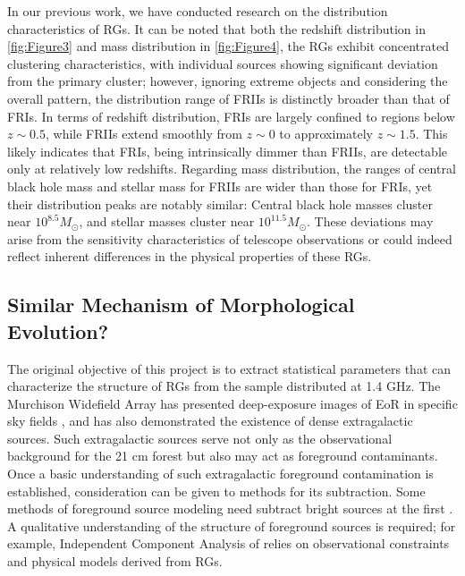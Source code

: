 \documentclass{aa}
\begin{document}
In our previous work, we have conducted research on the distribution characteristics of RGs. It can be noted that both the redshift distribution in \autoref{fig:Figure3} and mass distribution in \autoref{fig:Figure4}, the RGs exhibit concentrated clustering characteristics, with individual sources showing significant deviation from the primary cluster; however, ignoring extreme objects and considering the overall pattern, the distribution range of FRIIs is distinctly broader than that of FRIs. In terms of redshift distribution, FRIs are largely confined to regions below $z \sim 0.5$, while FRIIs extend smoothly from $z \sim 0$ to approximately $z \sim 1.5$. This likely indicates that FRIs, being intrinsically dimmer than FRIIs, are detectable only at relatively low redshifts. Regarding mass distribution, the ranges of central black hole mass and stellar mass for FRIIs are wider than those for FRIs, yet their distribution peaks are notably similar: Central black hole masses cluster near $10^{8.5} M_\odot$, and stellar masses cluster near $10^{11.5} M_\odot$. These deviations may arise from the sensitivity characteristics of telescope observations or could indeed reflect inherent differences in the physical properties of these RGs.



\subsection{Similar Mechanism of Morphological Evolution?}\label{sec:Section5_2}
The original objective of this project is to extract statistical parameters that can characterize the structure of RGs from the sample distributed at 1.4 GHz. The Murchison Widefield Array has presented deep-exposure images of EoR in specific sky fields \citep{offringa_parametrizing_2016}, and has also demonstrated the existence of dense extragalactic sources. Such extragalactic sources serve not only as the observational background for the 21 cm forest but also may act as foreground contaminants. Once a basic understanding of such extragalactic foreground contamination is established, consideration can be given to methods for its subtraction. Some methods of foreground source modeling need subtract bright sources at the first \citep{di_matteo_radio_2002,di_matteo_21-cm_2004}.  A qualitative understanding of the structure of foreground sources is required; for example, Independent Component Analysis of \cite{chapman_foreground_2012} relies on observational constraints and physical models derived from RGs. 
\end{document}
